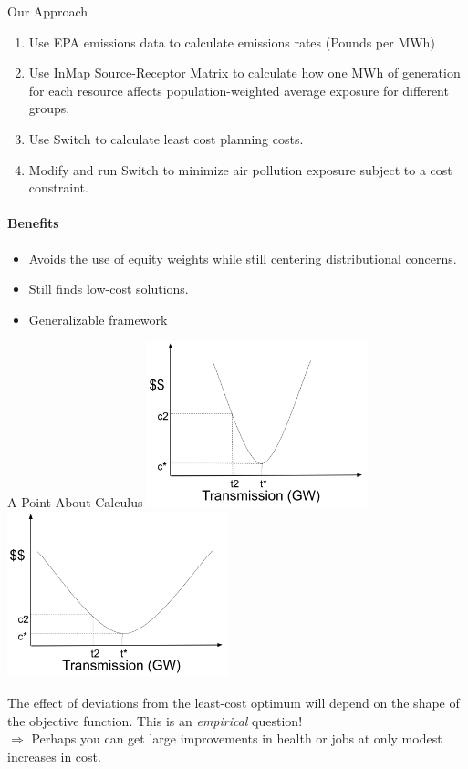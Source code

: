 \documentclass{beamer}
\begin{document}
\begin{frame}{Our Approach}
    \begin{enumerate}
        \item Use EPA emissions data to calculate emissions rates (Pounds per MWh)
        \item Use InMap Source-Receptor Matrix to calculate how one MWh of generation for each resource affects population-weighted average exposure for different groups.
        \item Use Switch to calculate least cost planning costs.
        \item Modify and run Switch to minimize air pollution exposure subject to a cost constraint.
    \end{enumerate}

\paragraph{Benefits}
\begin{itemize}
    \item Avoids the use of equity weights while still centering distributional concerns.
    \item Still finds low-cost solutions.
    \item Generalizable framework
\end{itemize}
\end{frame}


\begin{frame}{A Point About Calculus}
    \includegraphics[width=0.48\textwidth]{Figures/Slide Pictures/Transmission1.png} \includegraphics[width=0.48\textwidth]{Figures/Slide Pictures/Transmission2.png}

    The effect of deviations from the least-cost optimum will depend on the shape of the objective function.  This is an \textit{empirical} question!\\
    \vspace{.5cm}
    $\Rightarrow$ Perhaps you can get large improvements in health or jobs at only modest increases in cost.
\end{frame}
\end{document}
